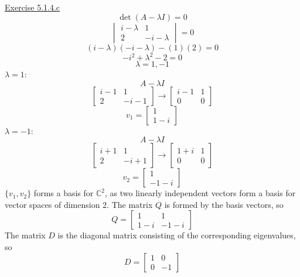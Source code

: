 \documentclass{exam}
\begin{document}
\underline{Exercise 5.1.4.c}
\newline
\newline
\[\det{(A-\lambda I)}=0\]
\[
\begin{vmatrix}
    i-\lambda & 1 \\
    2 & -i-\lambda
\end{vmatrix}=0
\]
\[(i-\lambda)(-i-\lambda)-(1)(2)=0\]
\[-i^2+\lambda^2-2=0\]
\[\lambda=1,-1\]
$\lambda=1:$
\[A-\lambda I\]
\[
\begin{bmatrix}
    i-1 & 1 \\
    2 & -i-1
\end{bmatrix}
\to
\begin{bmatrix}
    i-1 & 1 \\
    0 & 0
\end{bmatrix}
\]
\[v_1=
\begin{bmatrix}
    1 \\
    1-i
\end{bmatrix}
\]
$\lambda=-1:$
\[A-\lambda I\]
\[
\begin{bmatrix}
    i+1 & 1 \\
    2 & -i+1
\end{bmatrix}
\to
\begin{bmatrix}
    1+i & 1 \\
    0 & 0
\end{bmatrix}
\]
\[v_2=
\begin{bmatrix}
    1 \\
    -1-i
\end{bmatrix}
\]
$\{v_1,v_2\}$ forms a basis for $\mathbb{C}^2$, as two linearly independent vectors form a basis for vector spaces of dimension 2. The matrix $Q$ is formed by the basis vectors, so
\[Q=
\begin{bmatrix}
    1 & 1 \\
    1-i & -1-i
\end{bmatrix}
\]
The matrix $D$ is the diagonal matrix consisting of the corresponding eigenvalues, so
\[D=
\begin{bmatrix}
    1 & 0 \\
    0 & -1
\end{bmatrix}
\]
\newline
\end{document}
